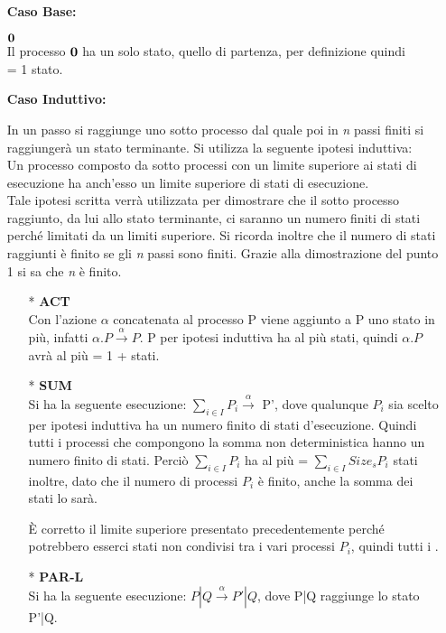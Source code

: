 \begin{itemize}
	\item[] \textbf{Caso Base:} \mbox{}
	
	 $\mathbf{0}$
	\\
	Il processo $\mathbf{0}$ ha un solo stato, quello di partenza, per definizione quindi\\ \sis{\zero} = 1 stato.
		\\
	\item[] \textbf{Caso Induttivo:} \mbox{}
	
	In un passo si raggiunge uno sotto processo dal quale poi in \textit{n} passi finiti si raggiungerà un stato terminante. Si utilizza la seguente ipotesi induttiva: \\
	Un processo composto da sotto processi con un limite superiore ai stati di esecuzione ha anch'esso un limite superiore di stati di esecuzione.\\
	Tale ipotesi scritta verrà utilizzata per dimostrare che il sotto processo raggiunto, da lui allo stato terminante, ci saranno un numero finiti di stati perché limitati da un limiti superiore. Si ricorda inoltre che il numero di stati raggiunti è finito se gli \textit{n} passi sono finiti. Grazie alla dimostrazione del punto 1 si sa che \textit{n} è finito.
	\\
	\begin{itemize}
		
		\item[*] \textbf{ACT}
		\\
		Con l'azione $\alpha$ concatenata al processo P viene aggiunto a P uno stato in più, infatti $\alpha.P \overset{\alpha}\rightarrow P$. P per ipotesi induttiva ha al più  stati, quindi $\alpha.P$ avrà al più  = 1 +  stati.
		\\
		\item[*] \textbf{SUM}
		\\
		Si ha la seguente esecuzione: $\displaystyle\sum_{i\in I}^{}P_{i} \overset{\alpha}\rightarrow$ P', dove qualunque $P_{i}$ sia scelto per ipotesi induttiva ha un numero finito di stati d'esecuzione. Quindi tutti i processi che compongono la somma non deterministica hanno un numero finito di stati.
		Perciò $\displaystyle\sum_{i\in I}^{}P_{i}$ ha al più  = $\displaystyle\sum_{i\in I}^{}Size_{s}{P_{i}}$ stati inoltre, dato che il numero di processi $P_{i}$ è finito, anche la somma dei stati lo sarà.
		
		È corretto il limite superiore presentato precedentemente perché potrebbero esserci stati non condivisi tra i vari processi $P_{i}$, quindi tutti i .
		\\
		\item[*] \textbf{PAR-L}
		\\
		Si ha la seguente esecuzione: $P|Q \overset{\alpha}\rightarrow P'|Q$, dove P|Q raggiunge lo stato P'|Q.
		

\end{itemize}
\end{itemize}
